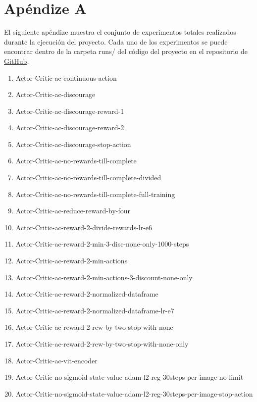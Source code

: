 

\chapter{Apéndize A}
\label{apendize-a}

El siguiente apéndize muestra el conjunto de experimentos totales realizados durante la ejecución del proyecto. Cada uno de los experimentos se puede encontrar dentro de la carpeta runs/ del código del proyecto en el repositorio de \href{https://github.com/lucaswerner90/msc-degree-ai}{GitHub}.
\medskip

\begin{enumerate}
	\item Actor-Critic-ac-continuous-action
	\item Actor-Critic-ac-discourage
	\item Actor-Critic-ac-discourage-reward-1
	\item Actor-Critic-ac-discourage-reward-2
	\item Actor-Critic-ac-discourage-stop-action
	\item Actor-Critic-ac-no-rewards-till-complete
	\item Actor-Critic-ac-no-rewards-till-complete-divided
	\item Actor-Critic-ac-no-rewards-till-complete-full-training
	\item Actor-Critic-ac-reduce-reward-by-four
	\item Actor-Critic-ac-reward-2-divide-rewards-lr-e6
	\item Actor-Critic-ac-reward-2-min-3-disc-none-only-1000-steps
	\item Actor-Critic-ac-reward-2-min-actions
	\item Actor-Critic-ac-reward-2-min-actions-3-discount-none-only
	\item Actor-Critic-ac-reward-2-normalized-dataframe
	\item Actor-Critic-ac-reward-2-normalized-dataframe-lr-e7
	\item Actor-Critic-ac-reward-2-rew-by-two-stop-with-none
	\item Actor-Critic-ac-reward-2-rew-by-two-stop-with-none-only
	\item Actor-Critic-ac-vit-encoder
	\item Actor-Critic-no-sigmoid-state-value-adam-l2-reg-30steps-per-image-no-limit
	\item Actor-Critic-no-sigmoid-state-value-adam-l2-reg-30steps-per-image-stop-action

\end{enumerate}
